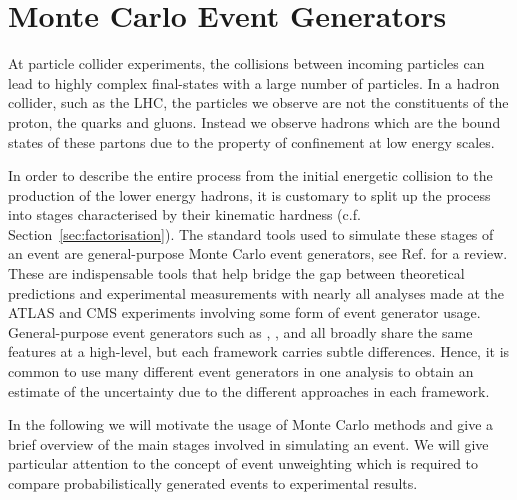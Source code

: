 \documentclass[main.tex]{subfiles}
\begin{document}
\chapter{Monte Carlo Event Generators}\label{chapter:MC}
    At particle collider experiments,
    the collisions between incoming particles can lead
    to highly complex final-states with a large number
    of particles. In a hadron collider, such as the LHC,
    the particles we observe are not the constituents
    of the proton, the quarks and gluons. Instead we observe
    hadrons which are the bound states of these partons
    due to the property of confinement at low energy scales.

    In order to describe the entire process
    from the initial energetic collision to the production
    of the lower energy hadrons, it is customary to
    split up the process into stages characterised by
    their kinematic hardness (c.f. Section~\ref{sec:factorisation}).
    The standard tools used
    to simulate these stages of an event are general-purpose
    Monte Carlo event generators, see
    Ref. \cite{Buckley:2011ms} for a review.
    These are indispensable tools that help
    bridge the gap between theoretical predictions
    and experimental measurements with nearly all
    analyses made at the ATLAS and CMS experiments
    involving some form of event generator usage.
    General-purpose event generators
    such as {\Herwig} \cite{Bahr:2008pv,Bellm:2015jjp},
    {\Pythia} \cite{Sjostrand:2006za,Bierlich:2022pfr},
    and {\Sherpa} \cite{Gleisberg:2008ta,Sherpa:2019gpd} all broadly share 
    the same features at a high-level, but each framework
    carries subtle differences. Hence, it is common
    to use many different event generators
    in one analysis to obtain an estimate of the uncertainty
    due to the different approaches in each framework.

    In the following we will motivate the usage of
    Monte Carlo methods and give a brief overview
    of the main stages involved in simulating an event.
    We will give particular attention to the concept of event
    unweighting which is required to compare probabilistically
    generated events to experimental results.
\end{document}
